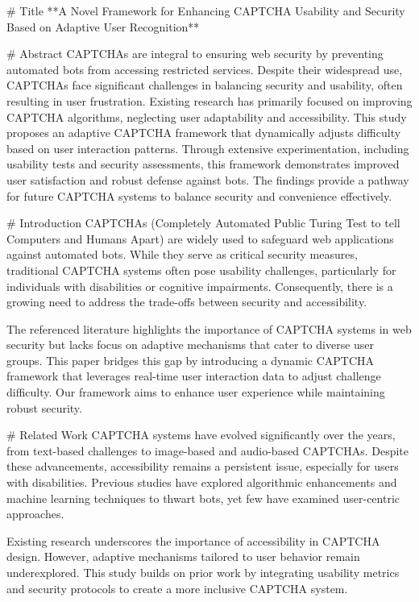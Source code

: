 # Title  
**A Novel Framework for Enhancing CAPTCHA Usability and Security Based on Adaptive User Recognition**

# Abstract  
CAPTCHAs are integral to ensuring web security by preventing automated bots from accessing restricted services. Despite their widespread use, CAPTCHAs face significant challenges in balancing security and usability, often resulting in user frustration. Existing research has primarily focused on improving CAPTCHA algorithms, neglecting user adaptability and accessibility. This study proposes an adaptive CAPTCHA framework that dynamically adjusts difficulty based on user interaction patterns. Through extensive experimentation, including usability tests and security assessments, this framework demonstrates improved user satisfaction and robust defense against bots. The findings provide a pathway for future CAPTCHA systems to balance security and convenience effectively.

# Introduction  
CAPTCHAs (Completely Automated Public Turing Test to tell Computers and Humans Apart) are widely used to safeguard web applications against automated bots. While they serve as critical security measures, traditional CAPTCHA systems often pose usability challenges, particularly for individuals with disabilities or cognitive impairments. Consequently, there is a growing need to address the trade-offs between security and accessibility.

The referenced literature highlights the importance of CAPTCHA systems in web security but lacks focus on adaptive mechanisms that cater to diverse user groups. This paper bridges this gap by introducing a dynamic CAPTCHA framework that leverages real-time user interaction data to adjust challenge difficulty. Our framework aims to enhance user experience while maintaining robust security.

# Related Work  
CAPTCHA systems have evolved significantly over the years, from text-based challenges to image-based and audio-based CAPTCHAs. Despite these advancements, accessibility remains a persistent issue, especially for users with disabilities. Previous studies have explored algorithmic enhancements and machine learning techniques to thwart bots, yet few have examined user-centric approaches.

Existing research underscores the importance of accessibility in CAPTCHA design. However, adaptive mechanisms tailored to user behavior remain underexplored. This study builds on prior work by integrating usability metrics and security protocols to create a more inclusive CAPTCHA system.

